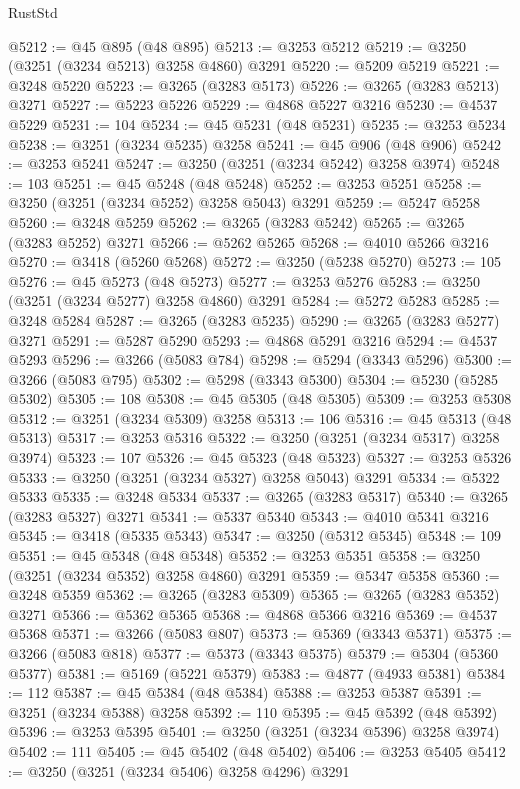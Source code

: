\begin{lexlean}{RustStd}
\begin{coremodule}
@5212 := @45 @895 (@48 @895)
@5213 := @3253 @5212
@5219 := @3250 (@3251 (@3234 @5213) @3258 @4860) @3291
@5220 := @5209 @5219
@5221 := @3248 @5220
@5223 := @3265 (@3283 @5173)
@5226 := @3265 (@3283 @5213) @3271
@5227 := @5223 @5226
@5229 := @4868 @5227 @3216
@5230 := @4537 @5229
@5231 := 104
@5234 := @45 @5231 (@48 @5231)
@5235 := @3253 @5234
@5238 := @3251 (@3234 @5235) @3258
@5241 := @45 @906 (@48 @906)
@5242 := @3253 @5241
@5247 := @3250 (@3251 (@3234 @5242) @3258 @3974)
@5248 := 103
@5251 := @45 @5248 (@48 @5248)
@5252 := @3253 @5251
@5258 := @3250 (@3251 (@3234 @5252) @3258 @5043) @3291
@5259 := @5247 @5258
@5260 := @3248 @5259
@5262 := @3265 (@3283 @5242)
@5265 := @3265 (@3283 @5252) @3271
@5266 := @5262 @5265
@5268 := @4010 @5266 @3216
@5270 := @3418 (@5260 @5268)
@5272 := @3250 (@5238 @5270)
@5273 := 105
@5276 := @45 @5273 (@48 @5273)
@5277 := @3253 @5276
@5283 := @3250 (@3251 (@3234 @5277) @3258 @4860) @3291
@5284 := @5272 @5283
@5285 := @3248 @5284
@5287 := @3265 (@3283 @5235)
@5290 := @3265 (@3283 @5277) @3271
@5291 := @5287 @5290
@5293 := @4868 @5291 @3216
@5294 := @4537 @5293
@5296 := @3266 (@5083 @784)
@5298 := @5294 (@3343 @5296)
@5300 := @3266 (@5083 @795)
@5302 := @5298 (@3343 @5300)
@5304 := @5230 (@5285 @5302)
@5305 := 108
@5308 := @45 @5305 (@48 @5305)
@5309 := @3253 @5308
@5312 := @3251 (@3234 @5309) @3258
@5313 := 106
@5316 := @45 @5313 (@48 @5313)
@5317 := @3253 @5316
@5322 := @3250 (@3251 (@3234 @5317) @3258 @3974)
@5323 := 107
@5326 := @45 @5323 (@48 @5323)
@5327 := @3253 @5326
@5333 := @3250 (@3251 (@3234 @5327) @3258 @5043) @3291
@5334 := @5322 @5333
@5335 := @3248 @5334
@5337 := @3265 (@3283 @5317)
@5340 := @3265 (@3283 @5327) @3271
@5341 := @5337 @5340
@5343 := @4010 @5341 @3216
@5345 := @3418 (@5335 @5343)
@5347 := @3250 (@5312 @5345)
@5348 := 109
@5351 := @45 @5348 (@48 @5348)
@5352 := @3253 @5351
@5358 := @3250 (@3251 (@3234 @5352) @3258 @4860) @3291
@5359 := @5347 @5358
@5360 := @3248 @5359
@5362 := @3265 (@3283 @5309)
@5365 := @3265 (@3283 @5352) @3271
@5366 := @5362 @5365
@5368 := @4868 @5366 @3216
@5369 := @4537 @5368
@5371 := @3266 (@5083 @807)
@5373 := @5369 (@3343 @5371)
@5375 := @3266 (@5083 @818)
@5377 := @5373 (@3343 @5375)
@5379 := @5304 (@5360 @5377)
@5381 := @5169 (@5221 @5379)
@5383 := @4877 (@4933 @5381)
@5384 := 112
@5387 := @45 @5384 (@48 @5384)
@5388 := @3253 @5387
@5391 := @3251 (@3234 @5388) @3258
@5392 := 110
@5395 := @45 @5392 (@48 @5392)
@5396 := @3253 @5395
@5401 := @3250 (@3251 (@3234 @5396) @3258 @3974)
@5402 := 111
@5405 := @45 @5402 (@48 @5402)
@5406 := @3253 @5405
@5412 := @3250 (@3251 (@3234 @5406) @3258 @4296) @3291

\end{coremodule}
\end{lexlean}
